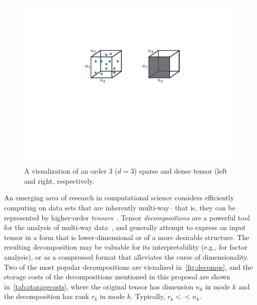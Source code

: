 \begin{figure}
  \centering 
  \includegraphics[width=0.6\linewidth]{thpropfigs/sparseanddense}
  \caption{A visualization of an order 3 ($d=3$) sparse and dense tensor (left and right, respectively.}
  \label{fig:sparseanddense}
\end{figure}
An emerging area of research in computational science considers efficiently computing on data sets that are 
inherently multi-way-- that is, they can be represented by higher-order \emph{tensors}~\cite{Acar09futuredirections}. 
%
%
Tensor \emph{decompositions} are a powerful tool for the analysis of multi-way data~\cite{Kolda:2009}, and generally attempt to express an input tensor in a form that is lower-dimensional or of a more desirable structure. The resulting decomposition may be valuable for its interpretability (e.g., for factor analysis), or as a compressed format that alleviates the curse of dimensionality. Two of the most popular decompositions are visualized in~\cref{fig:decomps}, and the storage costs of the decompositions mentioned in this proposal are shown in~\cref{tab:storagecosts}, where the original tensor has dimension $n_k$ in mode $k$ and the decomposition has rank $r_k$ in mode $k$. Typically, $r_k << n_k$.

